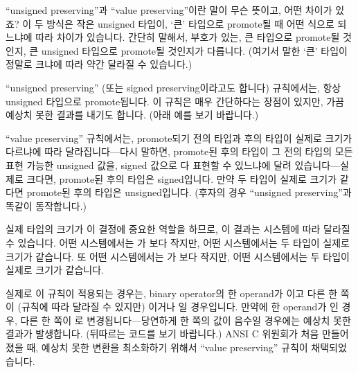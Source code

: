 \begin{faq}
        ``unsigned preserving''과 ``value preserving''이란 말이 무슨 뜻이고,
        어떤 차이가 있죠?
\A
        이 두 방식은 작은 unsigned 타입이, `큰' 타입으로 promote될 때 어떤 식으로 되느냐에
        따라 차이가 있습니다. 간단히 말해서, 부호가 있는, 큰 타입으로 promote될 것인지,
        큰 unsigned 타입으로 promote될 것인지가 다릅니다. (여기서 말한 `큰' 타입이
        정말로 크냐에 따라 약간 달라질 수 있습니다.)

        ``unsigned preserving'' (또는 signed preserving이라고도 합니다) 규칙에서는,
        항상 unsigned 타입으로 promote됩니다. 이 규칙은 매우 간단하다는 장점이 있지만,
        가끔 예상치 못한 결과를 내기도 합니다. (아래 예를 보기 바랍니다.)

        ``value preserving'' 규칙에서는, promote되기 전의 타입과 후의 타입이 실제로
        크기가 다르냐에 따라 달라집니다---다시 말하면, promote된 후의 타입이 그 전의 타입의
        모든 표현 가능한 unsigned 값을, signed 값으로 다 표현할 수 있느냐에 달려
        있습니다---실제로 크다면, promote된 후의 타입은 signed입니다. 만약 두 타입이 실제로
        크기가 같다면 promote된 후의 타입은 unsigned입니다. (후자의 경우 ``unsigned
        preserving''과 똑같이 동작합니다.)

        실제 타입의 크기가 이 결정에 중요한 역할을 하므로, 이 결과는 시스템에 따라 달라질 수
        있습니다. 어떤 시스템에서는 가 보다 작지만, 어떤 시스템에서는
        두 타입이 실제로 크기가 같습니다. 또 어떤 시스템에서는 가 보다
        작지만, 어떤 시스템에서는 두 타입이 실제로 크기가 같습니다.

        실제로 이 규칙이 적용되는 경우는, binary operator의 한 operand가
        이고 다른 한 쪽이 (규칙에 따라 달라질 수 있지만) 이거나
        일 경우입니다. 만약에 한 operand가 인 경우,
        다른 한 쪽이 로 변경됩니다---당연하게 한 쪽의 값이 음수일 경우에는
        예상치 못한 결과가 발생합니다. (뒤따르는 코드를 보기 바랍니다.)
        ANSI C 위원회가 처음 만들어졌을 때, 예상치 못한 변환을 최소화하기 위해서
        ``value preserving'' 규칙이 채택되었습니다. 

\end{faq}

%
%

